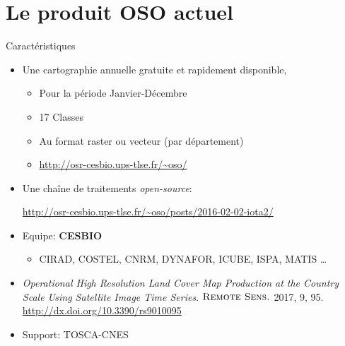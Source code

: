 \documentclass[pressentation,10pt,aspectratio=1610, xcolor=table]{beamer}
\begin{document}
\section{Le produit OSO actuel}
\label{sec:org42018af}
\begin{frame}[label={sec:org6a0b18f}]{Caractéristiques}
\begin{itemize}
\item Une cartographie annuelle gratuite et rapidement disponible,
\begin{itemize}
\item Pour la période \og Janvier-Décembre\fg
\item 17 Classes
\item Au format raster ou vecteur (par département)
\item \url{http://osr-cesbio.ups-tlse.fr/\~oso/}
\end{itemize}
\item Une chaîne de traitements \emph{open-source}:
\begin{center}
\url{http://osr-cesbio.ups-tlse.fr/\~oso/posts/2016-02-02-iota2/} 
\end{center}
\item Equipe: \textbf{CESBIO}
\begin{itemize}
\item CIRAD, COSTEL, CNRM, DYNAFOR, ICUBE, ISPA, MATIS \ldots{}
\end{itemize}
\item \emph{Operational High Resolution Land Cover Map Production at the Country
Scale Using Satellite Image  Time Series}.  \(\textsc{Remote Sens.}\)
2017, 9, 95. \url{http://dx.doi.org/10.3390/rs9010095}
\item Support: TOSCA-CNES
\end{itemize}
\end{frame}
\end{document}
